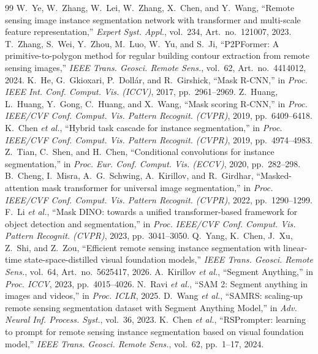 \documentclass{article}
\begin{document}
\clearpage

\begin{thebibliography}{99}
 W.~Ye, W.~Zhang, W.~Lei, W.~Zhang, X.~Chen, and Y.~Wang, ``Remote sensing image instance segmentation network with transformer and multi-scale feature representation,'' \textit{Expert Syst. Appl.}, vol.~234, Art.~no.~121007, 2023.
 T.~Zhang, S.~Wei, Y.~Zhou, M.~Luo, W.~Yu, and S.~Ji, ``P2PFormer: A primitive-to-polygon method for regular building contour extraction from remote sensing images,'' \textit{IEEE Trans. Geosci. Remote Sens.}, vol.~62, Art.~no.~4414012, 2024.
 K.~He, G.~Gkioxari, P.~Doll\'ar, and R.~Girshick, ``Mask R-CNN,'' in \textit{Proc. IEEE Int. Conf. Comput. Vis. (ICCV)}, 2017, pp.~2961--2969.
 Z.~Huang, L.~Huang, Y.~Gong, C.~Huang, and X.~Wang, ``Mask scoring R-CNN,'' in \textit{Proc. IEEE/CVF Conf. Comput. Vis. Pattern Recognit. (CVPR)}, 2019, pp.~6409--6418.
 K.~Chen \textit{et al.}, ``Hybrid task cascade for instance segmentation,'' in \textit{Proc. IEEE/CVF Conf. Comput. Vis. Pattern Recognit. (CVPR)}, 2019, pp.~4974--4983.
 Z.~Tian, C.~Shen, and H.~Chen, ``Conditional convolutions for instance segmentation,'' in \textit{Proc. Eur. Conf. Comput. Vis. (ECCV)}, 2020, pp.~282--298.
 B.~Cheng, I.~Misra, A.~G.~Schwing, A.~Kirillov, and R.~Girdhar, ``Masked-attention mask transformer for universal image segmentation,'' in \textit{Proc. IEEE/CVF Conf. Comput. Vis. Pattern Recognit. (CVPR)}, 2022, pp.~1290--1299.
 F.~Li \textit{et al.}, ``Mask DINO: towards a unified transformer-based framework for object detection and segmentation,'' in \textit{Proc. IEEE/CVF Conf. Comput. Vis. Pattern Recognit. (CVPR)}, 2023, pp.~3041--3050.
 Q.~Yang, K.~Chen, J.~Xu, Z.~Shi, and Z.~Zou, ``Efficient remote sensing instance segmentation with linear-time state-space-distilled visual foundation models,'' \textit{IEEE Trans. Geosci. Remote Sens.}, vol.~64, Art.~no.~5625417, 2026.
 A.~Kirillov \textit{et al.}, ``Segment Anything,'' in \textit{Proc. ICCV}, 2023, pp.~4015--4026.
 N.~Ravi \textit{et al.}, ``SAM 2: Segment anything in images and videos,'' in \textit{Proc. ICLR}, 2025.
 D.~Wang \textit{et al.}, ``SAMRS: scaling-up remote sensing segmentation dataset with Segment Anything Model,'' in \textit{Adv. Neural Inf. Process. Syst.}, vol.~36, 2023.
 K.~Chen \textit{et al.}, ``RSPrompter: learning to prompt for remote sensing instance segmentation based on visual foundation model,'' \textit{IEEE Trans. Geosci. Remote Sens.}, vol.~62, pp.~1--17, 2024.

\end{thebibliography}
\end{document}
